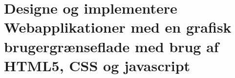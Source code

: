 \section{Designe og implementere Webapplikationer med en grafisk brugergrænseflade med brug af HTML5, CSS og javascript}\label{sec:spm10}